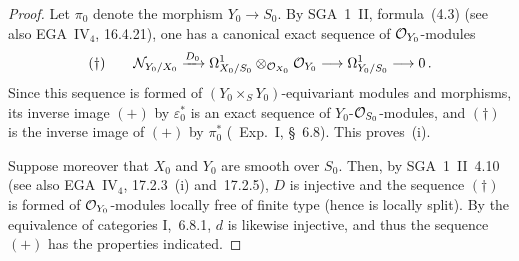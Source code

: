 \begin{proof}
{\renewcommand{\thefootnote}{(122)}}
Let \(\pi_{0}\) denote the morphism \(Y_{0}\to S_{0}\). By SGA~1~II,
formula~(4.3) (see also EGA~IV\(_4\), 16.4.21), one has a canonical exact
sequence of \(\mathcal{O}_{Y_{0}}\)-modules
\[
(\dagger)\qquad
\mathcal{N}_{Y_{0}/X_{0}}
\xrightarrow{D_{0}}
\Omega^{1}_{X_{0}/S_{0}}\otimes_{\mathcal{O}_{X_{0}}}\mathcal{O}_{Y_{0}}
\longrightarrow
\Omega^{1}_{Y_{0}/S_{0}}
\longrightarrow
0\,.
\]
Since this sequence is formed of \((Y_{0}\times_{S}Y_{0})\)-equivariant
modules and morphisms, its inverse image \((+)\) by \(\varepsilon_{0}^{*}\) is
an exact sequence of \(Y_{0}\)-\(\mathcal{O}_{S_{0}}\)-modules, and \((\dagger)\) is the
inverse image of \((+)\) by \(\pi_{0}^{*}\) (\cf\ Exp.~I, \S~6.8). This
proves~(i).

Suppose moreover that \(X_{0}\) and \(Y_{0}\) are smooth over \(S_{0}\). Then,
by SGA~1~II~4.10 (see also EGA~IV\(_4\), 17.2.3~(i) and~17.2.5), \(D\) is
injective and the sequence \((\dagger)\) is formed of
\(\mathcal{O}_{Y_{0}}\)-modules locally free of finite type (hence is locally split).
By the equivalence of categories I,~6.8.1, \(d\) is likewise injective, and
thus the sequence \((+)\) has the properties indicated.
\end{proof}

